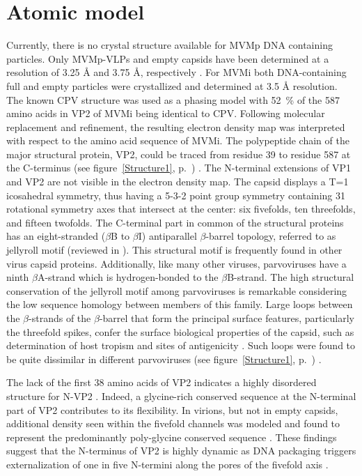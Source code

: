 \section{Atomic model}
\label{Structure}
Currently, there is no crystal structure available for MVMp DNA containing particles. Only MVMp-VLPs and empty capsids have been determined at a resolution of 3.25 \r{A} and 3.75 \r{A}, respectively \cite{pmid16103145}. For MVMi both DNA-containing full and empty particles were crystallized and determined at 3.5 \r{A} resolution. The known CPV structure \cite{pmid3379641} was used as a phasing model with 52~\% of the 587 amino acids in VP2 of MVMi being identical to CPV. Following molecular replacement and refinement, the resulting electron density map was interpreted with respect to the amino acid sequence of MVMi. The polypeptide chain of the major structural protein, VP2, could be traced from residue 39 to residue 587 at the C-terminus (see figure~\ref{Structure1}, p.~\pageref{Structure1}) \cite{pmid15299974}. The N-terminal extensions of VP1 and VP2 are not visible in the electron density map. The capsid displays a T=1 icosahedral symmetry, thus having a 5-3-2 point group symmetry containing 31 rotational symmetry axes that intersect at the center: six fivefolds, ten threefolds, and fifteen twofolds. The C-terminal part in common of the structural proteins has an eight-stranded ($\beta$B to $\beta$I) antiparallel $\beta$-barrel topology, referred to as jellyroll motif (reviewed in \cite{pmid2673017, Fundamental_Virology}). This structural motif is frequently found in other virus capsid proteins. Additionally, like many other viruses, parvoviruses have a ninth $\beta$A-strand which is hydrogen-bonded to the $\beta$B-strand. The high structural conservation of the jellyroll motif among parvoviruses is remarkable considering the low sequence homology between members of this family. Large loops between the $\beta$-strands of the $\beta$-barrel that form the principal surface features, particularly the threefold spikes, confer the surface biological properties of the capsid, such as determination of host tropism \cite{pmid1316457, pmid3942033} and sites of antigenicity \cite{pmid8985402, pmid1942246}. Such loops were found to be quite dissimilar in different parvoviruses (see figure~\ref{Structure1}, p.~\pageref{Structure1}) \cite{pmid8503170}. 

The lack of the first 38 amino acids of VP2 indicates a highly disordered structure for N-VP2 \cite{pmid15299974}. Indeed, a glycine-rich conserved sequence at the N-terminal part of VP2 contributes to its flexibility. In virions, but not in empty capsids, additional density seen within the fivefold channels was modeled and found to represent the predominantly poly-glycine conserved sequence \cite{pmid15299494, pmid8969301}. These findings suggest that the N-terminus of VP2 is highly dynamic as DNA packaging triggers externalization of one in five N-termini along the pores of the fivefold axis \cite{pmid9817841}.
 

